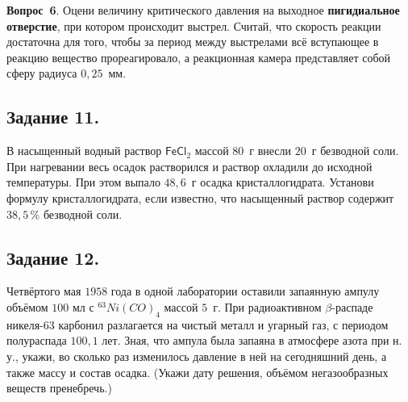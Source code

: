 \mbox{\textbf{Вопрос 6}.} Оцени величину критического давления на выходное \textbf{пигидиальное отверстие}, при котором происходит выстрел. Считай, что скорость реакции достаточна для того, чтобы за период между выстрелами всё вступающее в реакцию вещество прореагировало, а реакционная камера представляет собой сферу радиуса $0{,}25$~мм.
 	
\subsection*{Задание 11.}
В насыщенный водный раствор $\mathsf{FeCl}_2$ массой $80$~г внесли $20$~г безводной соли. При нагревании весь осадок растворился и раствор охладили до исходной температуры. При этом выпало $48{,}6$~г осадка кристаллогидрата. Установи формулу кристаллогидрата, если известно, что насыщенный раствор содержит $38{,}5\,\%$ безводной соли. 

\subsection*{Задание 12.}
Четвёртого мая $1958$ года в одной лаборатории оставили запаянную ампулу объёмом $100$ мл с $^{63}Ni(CO)_4$ массой $5$~г. При радиоактивном $\beta$-распаде никеля-$63$ карбонил разлагается на чистый металл и угарный газ, с периодом полураспада $100,1$ лет. Зная, что ампула была запаяна в атмосфере азота при н.\,у., укажи, во сколько раз изменилось давление в ней на сегодняшний день, а также массу и состав осадка. (Укажи дату решения, объёмом негазообразных веществ пренебречь.)

